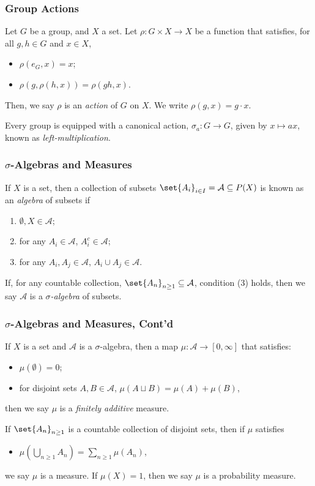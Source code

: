\documentclass{beamer-custom}
\begin{document}
\begin{frame}
  \frametitle{Group Actions}
  Let $G$ be a group, and $X$ a set. Let $\rho\colon G\times X \rightarrow X$ be a function that satisfies, for all $g,h\in G$ and $x\in X$,
  \begin{itemize}
    \item $\rho\left( e_G, x\right) = x$;
    \item $\rho\left( g,\rho\left( h,x \right) \right) = \rho\left( gh,x \right)$.
  \end{itemize}
  Then, we say $\rho$ is an \textit{action} of $G$ on $X$. We write $\rho\left( g,x \right) = g\cdot x$.\pause\newline

  Every group is equipped with a canonical action, $\sigma_{a}\colon G\rightarrow G$, given by $x\mapsto ax$, known as \textit{left-multiplication}.
\end{frame}
\begin{frame}
  \frametitle{$\sigma$-Algebras and Measures}
  If $X$ is a set, then a collection of subsets $\set{A_{i}}_{i\in I} = \mathcal{A}\subseteq P(X)$ is known as an \textit{algebra} of subsets if
  \begin{enumerate}
    \item $\emptyset,X\in \mathcal{A}$;
    \item for any $A_i\in \mathcal{A}$, $A_i^{c}\in \mathcal{A}$;
    \item for any $A_i,A_j\in \mathcal{A}$, $A_i\cup A_j\in \mathcal{A}$.
  \end{enumerate}\pause
  If, for any countable collection, $\set{A_n}_{n\geq 1}\subseteq \mathcal{A}$, condition (3) holds, then we say $\mathcal{A}$ is a \textit{$\sigma$-algebra} of subsets.
\end{frame}
\begin{frame}
  \frametitle{$\sigma$-Algebras and Measures, Cont'd}
  If $X$ is a set and $\mathcal{A}$ is a $\sigma$-algebra, then a map $\mu\colon \mathcal{A}\rightarrow [0,\infty]$ that satisfies:
  \begin{itemize}
    \item $\mu\left( \emptyset \right) = 0$;
    \item for disjoint sets $A,B\in \mathcal{A}$, $\mu\left( A\sqcup B \right) = \mu\left( A \right) + \mu\left( B \right)$,
  \end{itemize}
  then we say $\mu$ is a \textit{finitely additive} measure.\pause \newline

  If $\set{A_n}_{n\geq 1}$ is a countable collection of disjoint sets, then if $\mu$ satisfies
  \begin{itemize}
    \item $\displaystyle \mu\left( \bigcup_{n\geq 1}A_n \right) = \sum_{n\geq 1}\mu\left( A_n \right)$,
  \end{itemize}
  we say $\mu$ is a measure. If $\mu\left( X \right) = 1$, then we say $\mu$ is a probability measure.
\end{frame}
\end{document}

